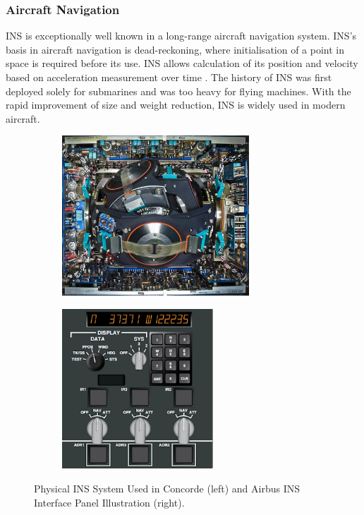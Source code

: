 \subsubsection{Aircraft Navigation}
INS is exceptionally well known in a long-range aircraft navigation system. INS's basis in aircraft navigation is dead-reckoning, where initialisation of a point in space is required before its use. INS allows calculation of its position and velocity based on acceleration measurement over time \cite{El-Sheimy2020InertialTrends}\cite{Loewy2003AircraftAvionics}. The history of INS was first deployed solely for submarines and was too heavy for flying machines. With the rapid improvement of size and weight reduction, INS is widely used in modern aircraft.\\

\begin{figure}[!ht]
\begin{center}
%    
  \begin{subfigure}[b]{0.55\textwidth}
    \includegraphics[height=6cm]{Figures/INS_Concorde.jpg}
  \end{subfigure}
%
  \begin{subfigure}[b]{0.35\textwidth}
    \includegraphics[height=6cm]{Figures/INS-IRS_InterfacePanel.png}
  \end{subfigure}
%  
  \caption{Physical INS System Used in Concorde (left) and Airbus INS Interface Panel Illustration (right).}
    \label{fig:concordeINS}
\end{center}
\end{figure}

